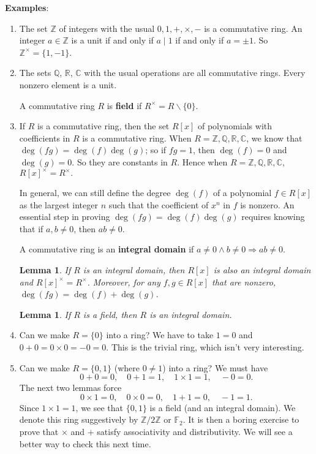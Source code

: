 \documentclass{article}
\def\Z{{\mathbb Z}}
\def\R{{\mathbb R}}
\def\F{{\mathbb F}}
\def\Q{{\mathbb Q}}
\def\Z{{\mathbb Z}}
\def\F{{\mathbb F}}
\def\Q{{\mathbb Q}}
\def\C{{\mathbb C}}
\newtheorem{lemma}[subsection]{Lemma}
\begin{document}
\noindent\textbf{Examples}:
\begin{enumerate}
    \item The set $\Z$ of integers with the usual $0,1,+,\times,-$ is a commutative ring. An integer $a\in\Z$ is a unit if and only if $a\mid 1$ if and only if $a = \pm 1$. So $\Z^\times = \{1,-1\}$.
    \item The sets $\Q$, $\R$, $\C$ with the usual operations are all commutative rings. Every nonzero element is a unit.

    A commutative ring $R$ is \textbf{field} if $R^\times = R \backslash \{0\}.$
    \item If $R$ is a commutative ring, then the set $R[x]$ of polynomials with coefficients in $R$ is a commutative ring. When $R = \Z,\Q,\R,\C$, we know that $\deg(fg) = \deg(f)\deg(g)$; so if $fg = 1$, then $\deg(f) = 0$ and $\deg(g) = 0$. So they are constants in $R$. Hence when $R = \Z,\Q,\R,\C$, $R[x]^\times = R^\times.$

    In general, we can still define the degree $\deg(f)$ of a polynomial $f\in R[x]$ as the largest integer $n$ such that the coefficient of $x^n$ in $f$ is nonzero. An essential step in proving $\deg(fg) = \deg(f)\deg(g)$ requires knowing that if $a,b\neq0$, then $ab\neq 0$.

    A commutative ring is an \textbf{integral domain} if $a\neq 0\wedge b\neq 0\Rightarrow ab\neq 0$.

    \begin{lemma}\label{lem:degfg}
        If $R$ is an integral domain, then $R[x]$ is also an integral domain and $R[x]^\times = R^\times$. Moreover, for any $f,g\in R[x]$ that are nonzero, $\deg(fg) = \deg(f) + \deg(g)$.
    \end{lemma}

    \begin{lemma}\label{lem:fieldid}
        If $R$ is a field, then $R$ is an integral domain.
    \end{lemma}

    \item Can we make $R = \{0\}$ into a ring? We have to take $1 = 0$ and $0+0=0\times0 = -0 = 0.$ This is the trivial ring, which isn't very interesting.

    \item Can we make $R = \{0,1\}$ (where $0\neq 1$) into a ring? We must have $$0+0 = 0,\quad 0 + 1 = 1, \quad 1\times 1 = 1,\quad -0 = 0.$$
    The next two lemmas force $$0\times 1 = 0,\quad 0\times 0 = 0,\quad 1 + 1 = 0,\quad -1 = 1.$$ Since $1\times 1 = 1$, we see that $\{0,1\}$ is a field (and an integral domain). We denote this ring suggestively by $\Z/2\Z$ or $\F_2$. It is then a boring exercise to prove that $\times$ and $+$ satisfy associativity and distributivity. We will see a better way to check this next time.


\end{enumerate}
\end{document}
